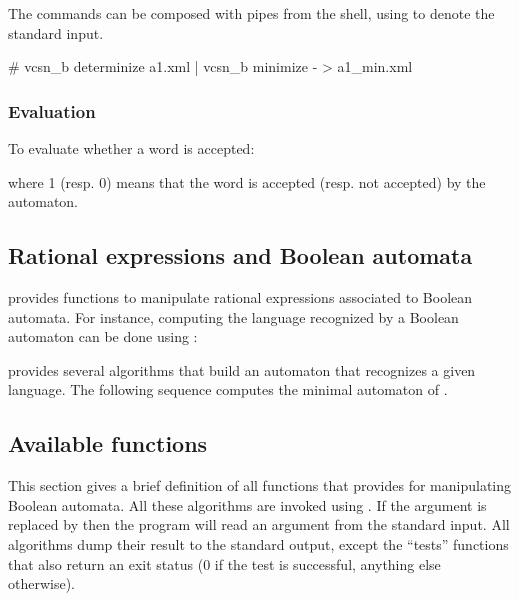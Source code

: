 The commands can be composed with pipes from the shell, using
\Index{\samp{-}} to denote the standard input.
\begin{shell}
# vcsn_b determinize a1.xml | vcsn_b minimize - > a1_min.xml
\end{shell}


\subsubsection{Evaluation}

To evaluate whether a word is accepted:


\noindent
where 1 (resp. 0) means that the word is accepted (resp. not accepted)
by the automaton.

\subsection{Rational expressions and Boolean automata}

\Vauc provides functions to manipulate rational expressions associated
to Boolean automata. For instance, computing the language recognized
by a Boolean automaton can be done using :


\Vauc provides several algorithms that build an automaton that
recognizes a given language.  The following sequence computes the
minimal automaton of .

\begin{center}
\end{center}

\subsection{Available functions}
This section gives a brief definition of all functions that \Vauc
provides for manipulating Boolean automata.  All these algorithms are
invoked using . If
the argument is replaced by \samp{-} then the program will read an
argument from the standard input.  All algorithms dump their result to
the standard output, except the ``tests'' functions that also return
an exit status (0 if the test is successful, anything else otherwise).

